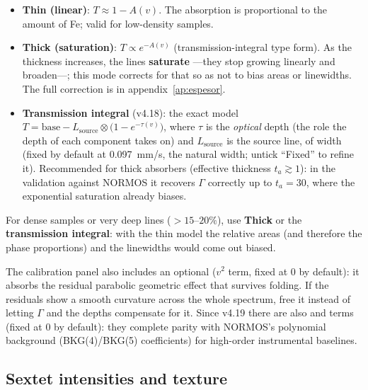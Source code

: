 \begin{itemize}[nosep]
  \item \textbf{Thin (linear)}: $T \approx 1 - A(v)$. The absorption is
        proportional to the amount of Fe; valid for low-density samples.
  \item \textbf{Thick (saturation)}: $T \propto e^{-A(v)}$ (transmission-integral
        type form). As the thickness increases, the lines \textbf{saturate} —they
        stop growing linearly and broaden—; this mode corrects for that so as not
        to bias areas or linewidths. The full correction is in
        appendix~\ref{ap:espesor}.
  \item \textbf{Transmission integral} (v4.18): the exact model
        $T = \text{base} - L_{\text{source}} \otimes \bigl(1 - e^{-\tau(v)}\bigr)$,
        where $\tau$ is the \emph{optical} depth (the role the depth of each
        component takes on) and $L_{\text{source}}$ is the source line, of width
         (fixed by default at 0.097~mm/s, the natural
        width; untick ``Fixed'' to refine it). Recommended for thick absorbers
        (effective thickness $t_a \gtrsim 1$): in the validation against NORMOS
        it recovers $\Gamma$ correctly up to $t_a = 30$, where the exponential
        saturation already biases.
\end{itemize}

\begin{truco}
For dense samples or very deep lines ($>15$--$20\%$), use \textbf{Thick} or the
\textbf{transmission integral}: with the thin model the relative areas (and
therefore the phase proportions) and the linewidths would come out biased.
\end{truco}

The calibration panel also includes an optional 
($v^2$ term, fixed at 0 by default): it absorbs the residual parabolic
geometric effect that survives folding. If the residuals show a smooth
curvature across the whole spectrum, free it instead of letting $\Gamma$ and
the depths compensate for it. Since v4.19 there are also  and
 terms (fixed at 0 by default): they complete parity
with NORMOS's polynomial background (BKG(4)/BKG(5) coefficients) for
high-order instrumental baselines.

\subsection{Sextet intensities and texture}
\label{sec:textura}

